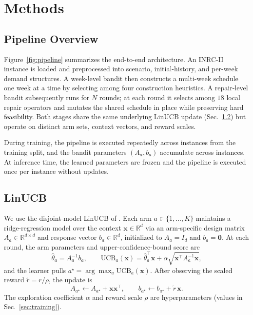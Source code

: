 \documentclass{article}
\begin{document}
\section{Methods}

\subsection{Pipeline Overview}

Figure~\ref{fig:pipeline} summarizes the end-to-end architecture. An
INRC-II instance is loaded and preprocessed into scenario, initial-history,
and per-week demand structures. A week-level bandit then constructs a
multi-week schedule one week at a time by selecting among four construction
heuristics. A repair-level bandit subsequently runs for $N$ rounds; at each
round it selects among $18$ local repair operators and mutates the shared
schedule in place while preserving hard feasibility. Both stages share the
same underlying LinUCB update (Sec.~\ref{sec:linucb}) but operate on
distinct arm sets, context vectors, and reward scales.

During training, the pipeline is executed repeatedly across instances from
the training split, and the bandit parameters $(A_a, b_a)$ accumulate
across instances. At inference time, the learned parameters are frozen and
the pipeline is executed once per instance without updates.

\subsection{LinUCB}
\label{sec:linucb}

We use the disjoint-model LinUCB of \citet{li2010contextual,chu2011contextual}.
Each arm $a \in \{1,\ldots,K\}$ maintains a ridge-regression model over the
context $\mathbf{x} \in \mathbb{R}^d$ via an arm-specific design matrix
$A_a \in \mathbb{R}^{d\times d}$ and response vector $b_a \in \mathbb{R}^d$,
initialized to $A_a = I_d$ and $b_a = \mathbf{0}$. At each round, the arm
parameters and upper-confidence-bound score are
\[
\hat{\theta}_a = A_a^{-1} b_a,
\qquad
\mathrm{UCB}_a(\mathbf{x}) =
\hat{\theta}_a^\top \mathbf{x} +
\alpha \sqrt{\mathbf{x}^\top A_a^{-1} \mathbf{x}},
\]
and the learner pulls $a^\star = \arg\max_a \mathrm{UCB}_a(\mathbf{x})$.
After observing the scaled reward $\tilde{r} = r/\rho$, the update is
\[
A_{a^\star} \leftarrow A_{a^\star} + \mathbf{x}\mathbf{x}^\top,
\qquad
b_{a^\star} \leftarrow b_{a^\star} + \tilde{r}\,\mathbf{x}.
\]
The exploration coefficient $\alpha$ and reward scale $\rho$ are
hyperparameters (values in Sec.~\ref{sec:training}).
\end{document}
